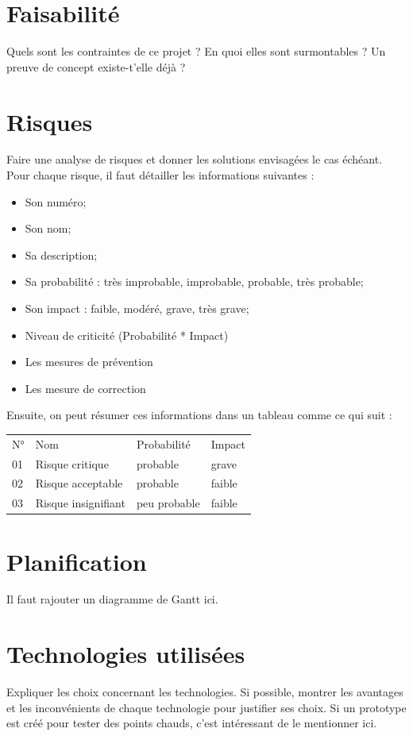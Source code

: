 \section{Faisabilité}
Quels sont les contraintes de ce projet ? En quoi elles sont surmontables ? Un preuve de concept existe-t'elle déjà ?

\section{Risques}
Faire une analyse de risques et donner les solutions envisagées le cas échéant.
Pour chaque risque, il faut détailler les informations suivantes :
\begin{itemize}
  \item Son numéro;
  \item Son nom;
  \item Sa description;
  \item Sa probabilité : très improbable, improbable, probable, très probable;
  \item Son impact :  faible, modéré, grave, très grave;
  \item Niveau de criticité (Probabilité * Impact)
  \item Les mesures de prévention
  \item Les mesure de correction
\end{itemize}

Ensuite, on peut résumer ces informations dans un tableau comme ce qui suit :

\begin{tabular}{ | l | l | l | l | }
  N° & Nom & Probabilité & Impact \\
  \rowcolor{red!60}
  01 & Risque critique & probable & grave \\
  \rowcolor{red!20}
  02 & Risque acceptable & probable & faible \\
  03 & Risque insignifiant & peu probable & faible
\end{tabular}

\section{Planification}
Il faut rajouter un diagramme de Gantt ici.

\section{Technologies utilisées}
Expliquer les choix concernant les technologies.
Si possible, montrer les avantages et les inconvénients de chaque technologie pour justifier ses choix.
Si un prototype est créé pour tester des points chauds, c'est intéressant de le mentionner ici.

